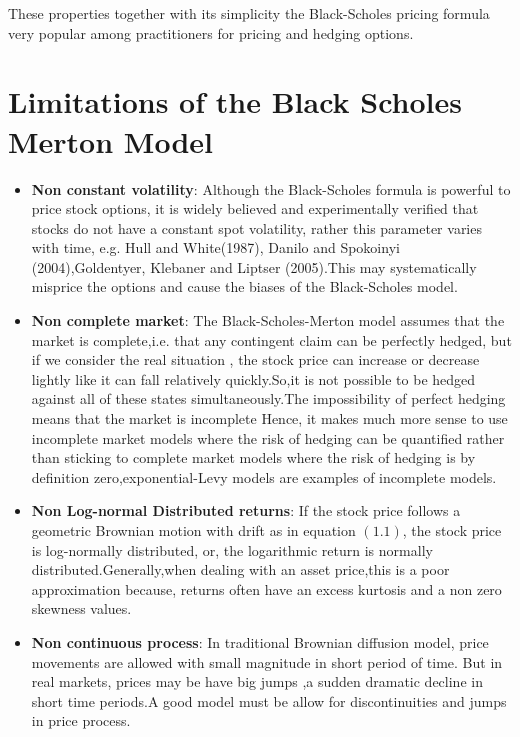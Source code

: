 \documentclass[12pt]{report}
\begin{document}
These properties together with its simplicity  the Black-Scholes pricing formula very popular among practitioners for pricing and hedging options. 
\section{ Limitations of the Black Scholes Merton Model }
\begin{itemize}
\item \textbf{Non constant volatility}:
Although the Black-Scholes formula is powerful to price stock options, it is widely believed and experimentally verified  that stocks do not have a constant spot volatility, rather this parameter varies with time, e.g. Hull and White(1987), Danilo and Spokoinyi (2004),Goldentyer, Klebaner and Liptser (2005).This may systematically misprice the options and cause the biases of the Black-Scholes model. 


\item \textbf{Non complete market}:
The Black-Scholes-Merton  model assumes that the market is complete,i.e.  that any contingent claim can be perfectly hedged, but if we consider the real situation , the stock price can increase or decrease
lightly like it can fall relatively quickly.So,it is not possible to be hedged against all of these states
simultaneously.The impossibility of perfect hedging means that the market is incomplete Hence, it makes much more sense to use incomplete market models where the risk of hedging can be quantified rather than sticking to complete market models where the risk of hedging is by definition zero,exponential-Levy models  are examples of incomplete models. 

\item \textbf{Non Log-normal Distributed returns}: If the stock price follows a geometric Brownian motion with drift  as in equation $(1.1)$, the stock price is log-normally distributed, or, the logarithmic return is normally
distributed.Generally,when dealing with an asset price,this is a poor approximation because, returns often have an excess kurtosis and a non zero skewness values.

\item \textbf{Non continuous process}:
In traditional Brownian diffusion model, price movements are allowed with  small magnitude in short period of time. But in real markets, prices may be have big jumps ,a sudden dramatic decline in short time periods.A good model must be allow for discontinuities and jumps in price process.

\end{itemize}
\end{document}
